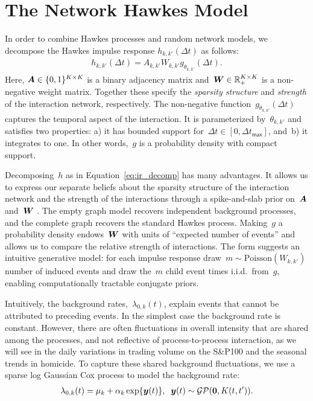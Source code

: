 \section{The Network Hawkes Model}\label{sec:basic_model}
In order to combine Hawkes processes and random network models, we decompose the Hawkes impulse response $h_{k,k'}(\Delta t)$ as follows:
\begin{align}
\label{eq:ir_decomp}
h_{k,k'}(\Delta t)=A_{k,k'}W_{k,k'}g_{\theta_{k,k'}}(\Delta t).
\end{align}
Here, ${\boldsymbol{A}\in\{0,1\}^{K\times K}}$ is a binary adjacency matrix and~${\boldsymbol{W}\in\mathbb{R}_+^{K\times K}}$ is a non-negative weight matrix. Together these specify the \emph{sparsity structure} and \emph{strength} of the interaction network, respectively. The non-negative function~${g_{\theta_{k,k'}}(\Delta t)}$ captures the temporal aspect of the interaction. It is parameterized by~${\theta_{k,k'}}$ and satisfies two properties: a) it has bounded support for~${\Delta t \in [0,\Delta t_{\mathsf{max}}]}$, and~b) it integrates to one. In other words,~$g$ is a probability density with compact support.

Decomposing~$h$ as in Equation~\ref{eq:ir_decomp} has many advantages. It allows us to express our separate beliefs about the sparsity structure of the interaction network and the strength of the interactions through a spike-and-slab prior on~$\boldsymbol{A}$ and~$\boldsymbol{W}$ \cite{Mohamed-2012}. 
The empty graph model recovers independent background processes, and the complete graph recovers the standard Hawkes process.
Making~$g$ a probability density endows~$\boldsymbol{W}$ with units of ``expected number of events'' and allows us to compare the relative strength of interactions. The form suggests an intuitive generative model: for each impulse response draw~${m\sim \text{Poisson}(W_{k,k'})}$ number of induced events and draw the~$m$ child event times i.i.d.\ from~$g$, enabling computationally tractable conjugate priors.

Intuitively, the background rates,~$\lambda_{0,k}(t)$, explain events that cannot be attributed to preceding events. In the simplest case the background rate is constant. However, there are often fluctuations in overall intensity that are shared among the processes, and not reflective of process-to-process interaction, as we will see in the daily variations in trading volume on the S\&P100 and the seasonal trends in homicide. To capture these shared background fluctuations, we use a sparse log Gaussian Cox process \cite{Moller-1998} to model the background rate:
\begin{align*}
  \lambda_{0,k}(t)=\mu_{k} + \alpha_{k}\exp\{\boldsymbol{y}(t)\},\;\;\boldsymbol{y}(t)\sim\mathcal{GP}(\boldsymbol{0},K(t,t')).
\end{align*}

